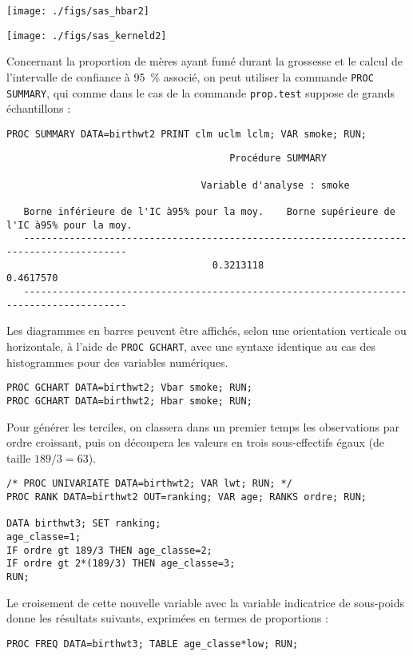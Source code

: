 \texttt{[image: ./figs/sas\_hbar2]}

\texttt{[image: ./figs/sas\_kerneld2]}

Concernant la proportion de mères ayant fumé durant la grossesse et
le calcul de l'intervalle de confiance à 95~\% associé, on peut utiliser la
commande \texttt{PROC SUMMARY}, qui comme dans le cas de la commande \R
\texttt{prop.test} suppose de grands échantillons :
\begin{verbatim}
PROC SUMMARY DATA=birthwt2 PRINT clm uclm lclm; VAR smoke; RUN;
\end{verbatim}

\begin{verbatim}
                                       Procédure SUMMARY

                                  Variable d'analyse : smoke

   Borne inférieure de l'IC à95% pour la moy.    Borne supérieure de l'IC à95% pour la moy.
   ----------------------------------------------------------------------------------------
                                    0.3213118                                     0.4617570
   ----------------------------------------------------------------------------------------
\end{verbatim}

Les diagrammes en barres peuvent être affichés, selon une orientation
verticale ou horizontale, à l'aide de \texttt{PROC GCHART}, avec une syntaxe
identique au cas des histogrammes pour des variables numériques.
\begin{verbatim}
PROC GCHART DATA=birthwt2; Vbar smoke; RUN;
PROC GCHART DATA=birthwt2; Hbar smoke; RUN;
\end{verbatim}

Pour générer les terciles, on classera dans un premier temps les
observations par ordre croissant, puis on découpera les valeurs en trois
sous-effectifs égaux (de taille $189/3=63$).
\begin{verbatim}
/* PROC UNIVARIATE DATA=birthwt2; VAR lwt; RUN; */
PROC RANK DATA=birthwt2 OUT=ranking; VAR age; RANKS ordre; RUN;

DATA birthwt3; SET ranking;
age_classe=1;
IF ordre gt 189/3 THEN age_classe=2; 
IF ordre gt 2*(189/3) THEN age_classe=3;
RUN;
\end{verbatim}
Le croisement de cette nouvelle variable avec la variable indicatrice de
sous-poids donne les résultats suivants, exprimées en termes de proportions :
\begin{verbatim}
PROC FREQ DATA=birthwt3; TABLE age_classe*low; RUN;
\end{verbatim}

